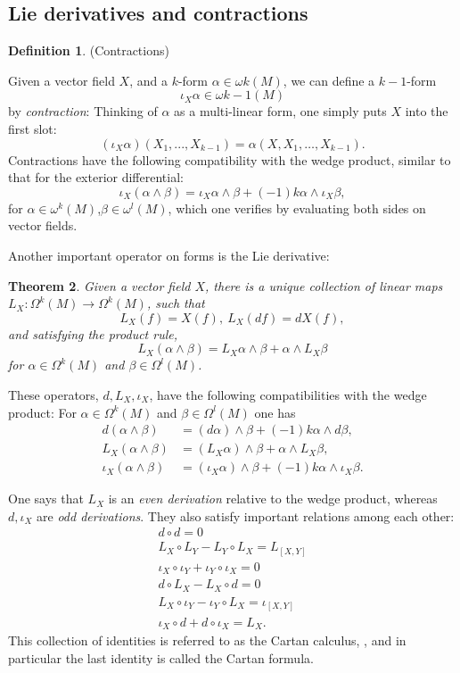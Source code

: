 \documentclass{article}
\newtheorem{theorem}{Theorem}[section]
\theoremstyle{definition}
\newtheorem{defn}[theorem]{Definition}
\newenvironment{definition}
  {\vspace{8pt}\begin{mdframed}[backgroundcolor=blueish,innertopmargin=4]\begin{defn}}
  {\end{defn}\end{mdframed}\vspace{4pt}}
\begin{document}
\subsection{Lie derivatives and contractions}

\begin{definition} (Contractions)

Given a vector field $X$, and a $k$-form $\alpha  \in \omega k (M)$, we can define a $k-1$-form 
\[
    \iota_X \alpha \in \omega  k-1 (M)
\] by \textit{contraction}: Thinking of $\alpha $ as a multi-linear form, one simply puts $X$ into the first slot:
\[
    (\iota_X\alpha )(X_1,...,X_{k-1}) = \alpha (X,X_1,\dots,X_{k-1}).
\]
Contractions have the following compatibility with the wedge product, similar to that for the exterior differential: 
\[
    \iota_X (\alpha  \wedge \beta ) = \iota_X\alpha  \wedge \beta  + (-1) k\alpha  \wedge \iota_X \beta , 
\]
for $\alpha  \in \omega^k (M)$,$\beta  \in \omega^l (M)$, which one verifies by evaluating both sides on vector fields.
\end{definition}

Another important operator on forms is the Lie derivative:

\begin{theorem}
Given a vector field $X$, there is a unique collection of linear maps $L_X : \Omega^k (M) \rightarrow \Omega^k (M)$, such that 
\[ 
    L_X (f) = X(f), \ L_X (d f) = dX(f),
\] 
and satisfying the product rule, 
\[
L_X (\alpha  \wedge \beta ) = L_X \alpha  \wedge \beta  +\alpha  \wedge L_X \beta  
\] 
for $\alpha  \in \Omega^k (M)$ and $\beta  \in \Omega^l (M)$.
\end{theorem}

These operators, $d, L_X, \iota_X$, have the following compatibilities with the wedge product: For $\alpha \in \Omega^k (M)$ and $\beta \in \Omega^l (M)$ one has 
\begin{align*}
d(\alpha \wedge\beta) &= (d\alpha)\wedge\beta + (-1) k\alpha \wedge d\beta,\\
L_X (\alpha \wedge\beta) &= (L_X\alpha)\wedge\beta +\alpha \wedge L_X \beta,\\
\iota_X (\alpha \wedge\beta) &= (\iota_X\alpha)\wedge\beta + (-1) k\alpha \wedge\iota_X \beta.
\end{align*}
  
One says that $L_X$ is an \textit{even derivation} relative to the wedge product, whereas $d,\iota_X$ are \textit{odd derivations}. They also satisfy important relations among each other:
\begin{align*}
    d \circ d = 0 \\
    L_X \circ L_Y -L_Y \circ L_X = L_{[X,Y]} \\
    \iota_X \circ \iota_Y +\iota_Y \circ \iota_X = 0 \\
    d \circ L_X -L_X \circ d = 0 \\
    L_X \circ \iota_Y -\iota_Y \circ L_X = \iota_[X,Y] \\
    \iota_X \circ d+d \circ \iota_X = L_X .
\end{align*}
This collection of identities is referred to as the Cartan calculus, , and in particular the last identity is called the Cartan formula.
\end{document}

